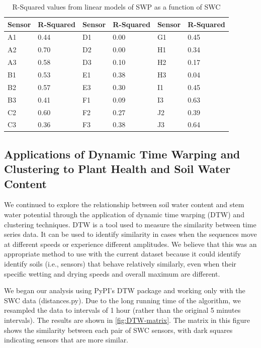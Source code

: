 \documentclass[12pt]{scrartcl}
\begin{document}
\begin{table}[!htb]\label{tab:linear}
\centering
\caption{R-Squared values from linear models of SWP as a function of SWC}
\begin{tabular}{@{}llllll@{}}
\toprule
Sensor & R-Squared & Sensor & R-Squared & Sensor & R-Squared \\ \midrule
A1     & 0.44      & D1     & 0.00      & G1     & 0.45      \\
A2     & 0.70      & D2     & 0.00      & H1     & 0.34      \\
A3     & 0.58      & D3     & 0.10      & H2     & 0.17      \\
B1     & 0.53      & E1     & 0.38      & H3     & 0.04      \\
B2     & 0.57      & E3     & 0.30      & I1     & 0.45      \\
B3     & 0.41      & F1     & 0.09      & I3     & 0.63      \\
C2     & 0.60      & F2     & 0.27      & J2     & 0.39      \\
C3     & 0.36      & F3     & 0.38      & J3     & 0.64      \\ \bottomrule
\end{tabular}
\end{table}




\subsection{Applications of Dynamic Time Warping and Clustering to Plant Health and Soil Water Content}
We continued to explore the relationship between soil water content and stem water potential through the application of dynamic time warping (DTW) and clustering techniques. DTW is a tool used to measure the similarity between time series data. It can be used to identify similarity in cases when the sequences move at different speeds or experience different amplitudes. We believe that this was an appropriate method to use with the current dataset because it could identify identify soils (i.e., sensors) that behave relatively similarly, even when their specific wetting and drying speeds and overall maximum are different.

We began our analysis using PyPI's DTW package and working only with the SWC data (distances.py). Due to the long running time of the algorithm, we resampled the data to intervals of 1 hour (rather than the original 5 minutes intervals). The results are shown in \autoref{fig:DTW-matrix}. The matrix in this figure shows the similarity between each pair of SWC sensors, with dark squares indicating sensors that are more similar.
\end{document}
